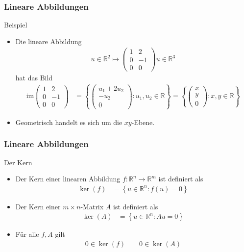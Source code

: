 \documentclass{beamer}
\newcommand\RR{\mathbb R}
\newcommand\cbc[1]{\left\{{#1}\right\}}
\newcommand{\ue}{\"u}
\newcommand{\im}{\mathrm{im}}
\newcommand{\mytitle}{Lineare Abbildungen}
\begin{document}
\begin{frame}\frametitle{\mytitle}
	\begin{block}{Beispiel}
		\begin{itemize}
			\item Die lineare Abbildung 
				\begin{align*}
					u\in\RR^2\mapsto\begin{pmatrix}1&2\\0&-1\\0&0\end{pmatrix}u\in\RR^3
				\end{align*}
				hat das Bild
				\begin{align*}
					\im\begin{pmatrix}1&2\\0&-1\\0&0\end{pmatrix}&
					=\cbc{\begin{pmatrix}u_1+2u_2\\-u_2\\0\end{pmatrix}:u_1,u_2\in\RR}	=\cbc{\begin{pmatrix}x\\y\\0\end{pmatrix}:x,y\in\RR}
				\end{align*}
			\item Geometrisch handelt es sich um die $xy$-Ebene.
		\end{itemize}
	\end{block}
\end{frame}

\begin{frame}\frametitle{\mytitle}
	\begin{block}{Der Kern}
		\begin{itemize}
			\item Der Kern einer linearen Abbildung $f:\RR^n\to\RR^m$ ist definiert als
				\begin{align*}
					\ker(f)&=\cbc{u\in\RR^n:f(u)=0}
				\end{align*}
			\item Der Kern einer $m\times n$-Matrix $A$ ist definiert als
\begin{align*}
					\ker(A)&=\cbc{u\in\RR^n:Au=0}
				\end{align*}
			\item F\ue r alle $f,A$ gilt
				\begin{align*}
					0\in\ker(f)\qquad 0\in\ker(A)
				\end{align*}
		\end{itemize}
	\end{block}
\end{frame}
\end{document}
